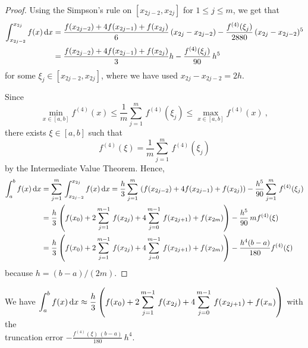 \begin{proof}
Using the Simpson's rule on $[x_{2j-2},x_{2j}]$ for $1 \leq j\leq m$,
we get that
\begin{align*}
\int_{x_{2j-2}}^{x_{2j}} f(x) \,\mathrm{d}x &= \frac{f(x_{2j-2}) +
  4f(x_{2j-1}) + f(x_{2j})}{6}\left(x_{2j}-x_{2j-2}\right) -
\frac{f^{(4)}(\xi_j)}{2880}\,(x_{2j}-x_{2j-2})^5 \\
&= \frac{f(x_{2j-2}) + 4f(x_{2j-1}) +
 f(x_{2j})}{3}h - \frac{f^{(4)}(\xi_j)}{90}\,h^5
\end{align*}
for some $\xi_j \in [x_{2j-2},x_{2j}]$, where we have used
$x_{2j} -x_{2j-2} = 2h$.

Since
\[
\min_{x\in [a,b]} f^{(4)}(x) \leq
\frac{1}{m}\sum_{j=1}^{m}\,f^{(4)}(\xi_j) \leq
\max_{x\in [a,b]} f^{(4)}(x) \ ,
\]
there exists $\xi \in [a,b]$ such that
\[
f^{(4)}(\xi) = \frac{1}{m}\sum_{j=1}^{m}\,f^{(4)}(\xi_j)
\]
by the Intermediate Value Theorem.  Hence,
\begin{align*}
\int_a^b f(x) \,\mathrm{d}x &= \sum_{j=1}^{m}\,
 \int_{x_{2j-2}}^{x_{2j}} f(x)\,\mathrm{d}x
= \frac{h}{3} \sum_{j=1}^{m}\,\left(f(x_{2j-2}) + 4f(x_{2j-1}) +
 f(x_{2j})\right) - \frac{h^5}{90}
 \sum_{j=1}^{m}\,f^{(4)}(\xi_j) \\
&= \frac{h}{3} \left(f(x_0) + 2\sum_{j=1}^{m-1}\,f(x_{2j}) +
4\sum_{j=0}^{m-1}\,f(x_{2j+1}) + f(x_{2m})\right) -
\frac{h^5}{90}\,mf^{(4)}(\xi) \\
&= \frac{h}{3} \left(f(x_0) + 2\sum_{j=1}^{m-1}\,f(x_{2j}) +
4\sum_{j=0}^{m-1}\,f(x_{2j+1}) + f(x_{2m})\right) -
\frac{h^4(b-a)}{180}f^{(4)}(\xi)
\end{align*}
because $h = (b-a)/(2m)$.
\end{proof}


\begin{rmk}
We have
$\displaystyle \int_a^b f(x)\,\mathrm{d}x \approx
\frac{h}{3} \left(f(x_0) + 2\sum_{j=1}^{m-1}\,f(x_{2j}) +
4 \sum_{j=0}^{m-1}\,f(x_{2j+1}) + f(x_n) \right)$ with the\\ truncation
error $\displaystyle -\frac{f^{(4)}(\xi)\,(b-a)}{180}\,h^4$.
\end{rmk}

